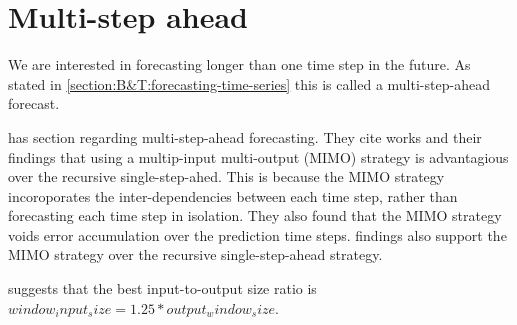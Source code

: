 \section{Multi-step ahead}
\label{section:RelatedWork:multi-step-ahead}
We are interested in forecasting longer than one time step in the future.
As stated in \autoref{section:B&T:forecasting-time-series} this is called a multi-step-ahead forecast.

\cite{Hewamalage2021} has section regarding multi-step-ahead forecasting.
They cite \cite{BenTaieb2011} works and their findings that 
using a multip-input multi-output (MIMO) strategy is 
advantagious over the recursive single-step-ahed. This is because the MIMO strategy
incoroporates the inter-dependencies between each time step, rather than forecasting
each time step in isolation. They also found that the MIMO strategy voids error 
accumulation over the prediction time steps.
\cite{Ramos2015} findings also support the MIMO strategy over the recursive
single-step-ahead strategy.

\cite{Hewamalage2021} suggests that the best input-to-output size ratio
is $window_input_size = 1.25 * output_window_size$.
